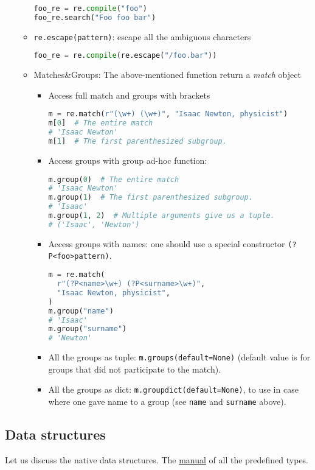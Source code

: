 \documentclass[a4paper,12pt,%
              final%
              ]{article}
\begin{document}
\begin{itemize}
\begin{itemize}
\begin{lstlisting}[language=python]
foo_re = re.compile("foo")
foo_re.search("Foo foo bar")
\end{lstlisting}
      \item \verb|re.escape(pattern)|: escape all the ambiguous characters
\begin{lstlisting}[language=python]
foo_re = re.compile(re.escape("/foo.bar"))
\end{lstlisting}
      \item Matches\&Groups: The above-mentioned function return a \emph{match} object
        \begin{itemize}
          \item Access full match and groups with brackets
\begin{lstlisting}[language=python]
m = re.match(r"(\w+) (\w+)", "Isaac Newton, physicist")
m[0]  # The entire match
# 'Isaac Newton'
m[1]  # The first parenthesized subgroup.
\end{lstlisting}
          \item Access groups with group ad-hoc function:
\begin{lstlisting}[language=python]
m.group(0)  # The entire match
# 'Isaac Newton'
m.group(1)  # The first parenthesized subgroup.
# 'Isaac'
m.group(1, 2)  # Multiple arguments give us a tuple.
# ('Isaac', 'Newton')
\end{lstlisting}
          \item Access groups with names: one should use a special constructor \texttt{(?P<foo>pattern)}.
\begin{lstlisting}[language=python]
m = re.match(
  r"(?P<name>\w+) (?P<surname>\w+)",
  "Isaac Newton, physicist",
)
m.group("name")
# 'Isaac'
m.group("surname")
# 'Newton'
\end{lstlisting}
          \item All the groups as tuple: \verb|m.groups(default=None)| (default value is for groups that did not participate to the match).
          \item All the groups as dict: \verb|m.groupdict(default=None)|, to use in case where one gave name to a group (see \texttt{name} and \texttt{surname} above).
        \end{itemize}
    \end{itemize}
\end{itemize}

\subsection{Data structures}
Let us discuss the native data structures. The \href{https://docs.python.org/3/library/stdtypes.html}{manual} of all the predefined types.
\end{document}
